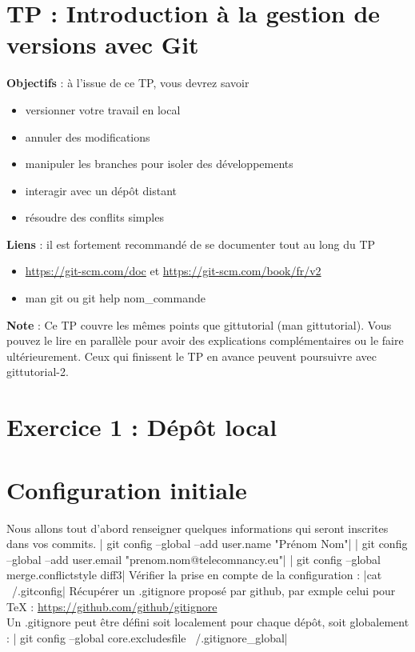 \section*{TP : Introduction à la gestion de versions avec Git}
\textbf{Objectifs} : à l'issue de ce TP, vous devrez savoir
\begin{itemize}
\item versionner votre travail en local
\item annuler des modifications
\item manipuler les branches pour isoler des développements
\item interagir avec un dépôt distant
\item résoudre des conflits simples
\end{itemize}


\textbf{Liens }: il est fortement recommandé de se documenter tout au long du TP

\begin{itemize}
\item \url{https://git-scm.com/doc} et \url{https://git-scm.com/book/fr/v2}
\item man git ou git help nom\_commande
\end{itemize}

\textbf{Note} : Ce TP couvre les mêmes points que gittutorial (man gittutorial). Vous pouvez le lire en parallèle pour
avoir des explications complémentaires ou le faire ultérieurement. Ceux qui finissent le TP en avance
peuvent poursuivre avec gittutorial-2.

\section{Exercice 1 : Dépôt local}
\section{Configuration initiale}
Nous allons tout d'abord renseigner quelques informations qui seront inscrites dans vos commits.
| git config --global --add user.name "Prénom Nom"|
| git config --global --add user.email "prenom.nom@telecomnancy.eu"|
| git config --global merge.conflictstyle diff3|
Vérifier la prise en compte de la configuration : 
|cat ~/.gitconfig|
Récupérer un .gitignore proposé par github, par exmple celui pour TeX :
\url{https://github.com/github/gitignore}\\
Un .gitignore peut être défini soit localement pour chaque dépôt, soit globalement :
| git config --global core.excludesfile ~/.gitignore_global|

